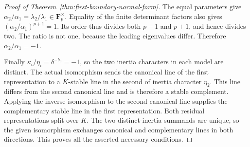 \begin{proof}[Proof of Theorem~\ref{thm:first-boundary-normal-form}]
The equal parameters give
$\alpha_2/\alpha_1=\lambda_2/\lambda_1\in\mathbf F_p^\times$.
Equality of the finite determinant factors also gives
$(\alpha_2/\alpha_1)^{p+1}=1$. Its order thus divides both $p-1$
and $p+1$, and hence divides two. The ratio is not one, because
the leading eigenvalues differ. Therefore $\alpha_2/\alpha_1=-1$.

Finally $\kappa_i/\eta_i=\delta^{-b_0}=-1$, so the two inertia
characters in each model are distinct. The actual isomorphism
sends the canonical line of the first representation to a
$K$-stable line in the second of inertia character $\eta_2$.
This line differs from the second canonical line and is therefore
a stable complement. Applying the inverse isomorphism to the
second canonical line supplies the complementary stable line in
the first representation. Both residual representations split
over $K$. The two distinct-inertia summands are unique, so the
given isomorphism exchanges canonical and complementary lines
in both directions. This proves all the asserted necessary
conditions.
\end{proof}
